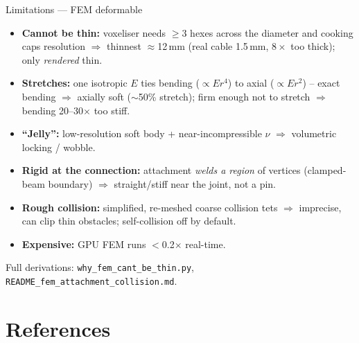 \documentclass[aspectratio=169]{beamer}
\begin{document}
\begin{frame}{Limitations --- FEM deformable}
  \footnotesize
  \begin{itemize}\itemsep1pt
    \item \textbf{Cannot be thin:} voxeliser needs $\geq$3 hexes across the diameter and
          cooking caps resolution $\Rightarrow$ thinnest $\approx$12\,mm (real cable
          1.5\,mm, $8\times$ too thick); only \emph{rendered} thin.
    \item \textbf{Stretches:} one isotropic $E$ ties bending ($\propto E r^4$) to axial
          ($\propto E r^2$) -- exact bending $\Rightarrow$ axially soft ($\sim$50\%
          stretch); firm enough not to stretch $\Rightarrow$ bending 20--30$\times$ too stiff.
    \item \textbf{``Jelly'':} low-resolution soft body + near-incompressible $\nu$
          $\Rightarrow$ volumetric locking / wobble.
    \item \textbf{Rigid at the connection:} attachment \emph{welds a region} of vertices
          (clamped-beam boundary) $\Rightarrow$ straight/stiff near the joint, not a pin.
    \item \textbf{Rough collision:} simplified, re-meshed coarse collision tets
          $\Rightarrow$ imprecise, can clip thin obstacles; self-collision off by default.
    \item \textbf{Expensive:} GPU FEM runs $<$0.2$\times$ real-time.
  \end{itemize}
  {\scriptsize Full derivations: \texttt{why\_fem\_cant\_be\_thin.py},
   \texttt{README\_fem\_attachment\_collision.md}.}
\end{frame}

\section{References}
\end{document}
